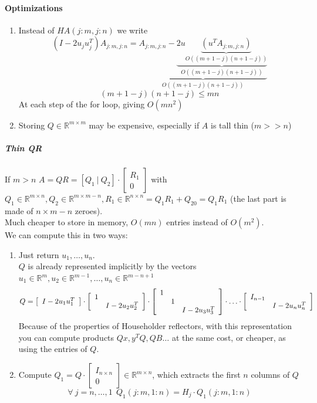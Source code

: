 \documentclass[10pt]{report}
\begin{document}
\paragraph{Optimizations}
\begin{enumerate}
	\item Instead of $HA(j:m,j:n)$ we write
	$$(I-2u_ju_j^T)A_{j:m,j:n}=\underset{O((m+1-j)(n+1-j))}{\underbrace{A_{j:m,j:n}-\underset{O((m+1-j)(n+1-j))}{\underbrace{2u \underset{O((m+1-j)(n+1-j))}{\underbrace{(u^TA_{j:m,j:n})}}}}}}$$
	$$(m+1-j)(n+1-j)\leq mn$$
	At each step of the for loop, giving $O(mn^2)$
	\item Storing $Q \in \mathbb{R}^{m\times m}$ may be expensive, especially if $A$ is tall thin ($m>>n$)
\end{enumerate}
\subparagraph{Thin QR} If $m>n$ $A=QR = [Q_1\:|\:Q_2]\cdot\left[\begin{array}{c}
R_1\\\hline0
\end{array}\right]$ with $Q_1\in \mathbb{R}^{m\times n}, Q_2\in \mathbb{R}^{m\times m-n}, R_1\in \mathbb{R}^{n\times n} = Q_1R_1+Q_20 = Q_1R_1$ (the last part is made of $n\times m-n$ zeroes).\\
Much cheaper to store in memory, $O(mn)$ entries instead of $O(m^2)$.\\
We can compute this in two ways:
\begin{enumerate}
	\item Just return $u_1,\ldots,u_n$.\\
	$Q$ is already represented implicitly by the vectors $u_1\in\mathbb{R}^m,u_2\in\mathbb{R}^{m-1},\ldots,u_n\in\mathbb{R}^{m-n+1}$
	$$Q=\left[\begin{array}{c}
	I-2u_1u_1^T
	\end{array}\right]\cdot\left[\begin{array}{c c}
	1\\
	&I-2u_2u_2^T
	\end{array}\right]\cdot\left[\begin{array}{c c c}
	1\\
	&1\\
	&&I-2u_3u_3^T
	\end{array}\right]\cdot\ldots\cdot\left[\begin{array}{c c}
	I_{n-1}\\
	&I-2u_nu_n^T
	\end{array}\right]$$
	Because of the properties of Householder reflectors, with this representation you can compute products $Qx,y^TQ, QB\ldots$ at the same cost, or cheaper, as using the entries of $Q$.
	\item Compute $Q_1=Q\cdot\left[\begin{array}{c}
	I_{n\times n}\\0
	\end{array}\right]\in\mathbb{R}^{m\times n}$, which extracts the first $n$ columns of $Q$
	$$\forall\:j=n,\ldots,1\:\:Q_1(j:m,1:n) = H_j\cdot Q_1(j:m,1:n)$$
\end{enumerate}
\end{document}
